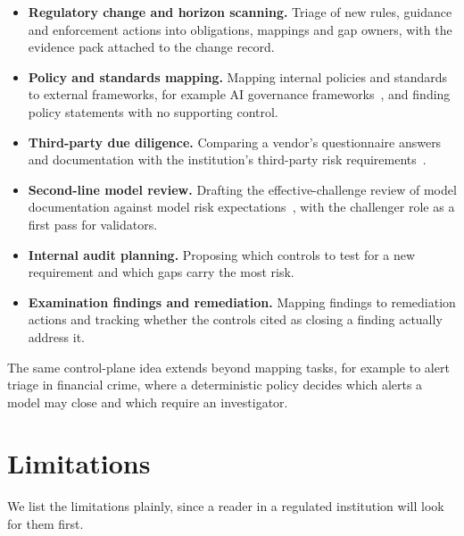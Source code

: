 \documentclass[sigconf,review,anonymous]{acmart}
\begin{document}
\begin{itemize}
  \item \textbf{Regulatory change and horizon scanning.} Triage of new
  rules, guidance and enforcement actions into obligations, mappings and gap
  owners, with the evidence pack attached to the change record.
  \item \textbf{Policy and standards mapping.} Mapping internal policies
  and standards to external frameworks, for example AI governance
  frameworks~\cite{nistairmf,euaiact}, and finding policy statements with no
  supporting control.
  \item \textbf{Third-party due diligence.} Comparing a vendor's
  questionnaire answers and documentation with the institution's
  third-party risk requirements~\cite{tprm2023}.
  \item \textbf{Second-line model review.} Drafting the effective-challenge
  review of model documentation against model risk
  expectations~\cite{mrm2026}, with the challenger role as a first pass for
  validators.
  \item \textbf{Internal audit planning.} Proposing which controls to test
  for a new requirement and which gaps carry the most risk.
  \item \textbf{Examination findings and remediation.} Mapping findings to
  remediation actions and tracking whether the controls cited as closing a
  finding actually address it.
\end{itemize}

The same control-plane idea extends beyond mapping tasks, for example to
alert triage in financial crime, where a deterministic policy decides which
alerts a model may close and which require an investigator.

\section{Limitations}
\label{sec:limits}

We list the limitations plainly, since a reader in a regulated institution
will look for them first.
\end{document}
